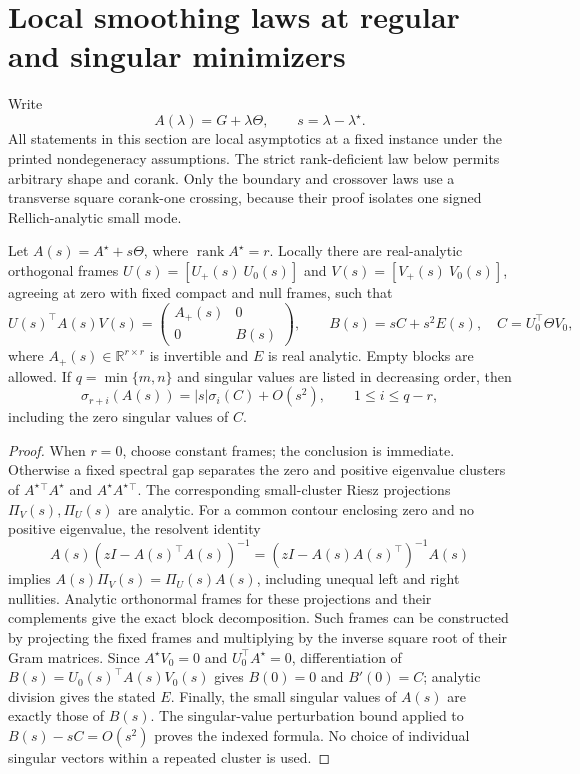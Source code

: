 \section{Local smoothing laws at regular and singular minimizers}
\label{sec:rates}

Write
\[
 A(\lambda)=G+\lambda\Theta,
 \qquad s=\lambda-\lambda^\star.
\]
All statements in this section are local asymptotics at a fixed instance
under the printed nondegeneracy assumptions.  The strict rank-deficient law
below permits arbitrary shape and corank.  Only the boundary and crossover
laws use a transverse square corank-one crossing, because their proof isolates
one signed Rellich-analytic small mode.

\begin{lemma}
\label{lem:analytic-cluster-block-main}
Let \(A(s)=A^\star+s\Theta\), where \(\operatorname{rank}A^\star=r\).
Locally there are real-analytic orthogonal frames
\(U(s)=[U_+(s)\ U_0(s)]\) and \(V(s)=[V_+(s)\ V_0(s)]\), agreeing
at zero with fixed compact and null frames, such that
\[
 U(s)^\top A(s)V(s)=
 \begin{pmatrix}A_+(s)&0\\0&B(s)\end{pmatrix},
 \qquad B(s)=sC+s^2E(s),\quad C=U_0^\top\Theta V_0,
\]
where \(A_+(s)\in\mathbb R^{r\times r}\) is invertible and \(E\) is
real analytic.  Empty blocks are allowed.  If \(q=\min\{m,n\}\) and
singular values are listed in decreasing order, then
\[
 \sigma_{r+i}(A(s))=|s|\sigma_i(C)+O(s^2),
 \qquad 1\le i\le q-r,
\]
including the zero singular values of \(C\).
\end{lemma}

\begin{proof}
When \(r=0\), choose constant frames; the conclusion is immediate.
Otherwise a fixed spectral gap separates the zero and positive eigenvalue
clusters of \(A^\star{}^\top A^\star\) and \(A^\star A^\star{}^\top\).
The corresponding small-cluster Riesz projections \(\Pi_V(s),\Pi_U(s)\)
are analytic.  For a common contour enclosing zero and no positive
eigenvalue, the resolvent identity
\[
 A(s)(zI-A(s)^\top A(s))^{-1}
 =(zI-A(s)A(s)^\top)^{-1}A(s)
\]
implies \(A(s)\Pi_V(s)=\Pi_U(s)A(s)\), including unequal left and
right nullities.  Analytic orthonormal frames for these projections and
their complements give the exact block decomposition.  Such frames can
be constructed by projecting the fixed frames and multiplying by the
inverse square root of their Gram matrices.  Since
\(A^\star V_0=0\) and \(U_0^\top A^\star=0\), differentiation of
\(B(s)=U_0(s)^\top A(s)V_0(s)\) gives \(B(0)=0\) and \(B'(0)=C\);
analytic division gives the stated \(E\).  Finally, the small singular
values of \(A(s)\) are exactly those of \(B(s)\).  The singular-value
perturbation bound applied to \(B(s)-sC=O(s^2)\) proves the indexed formula.
No choice of individual singular vectors within a repeated cluster is used.
\end{proof}

